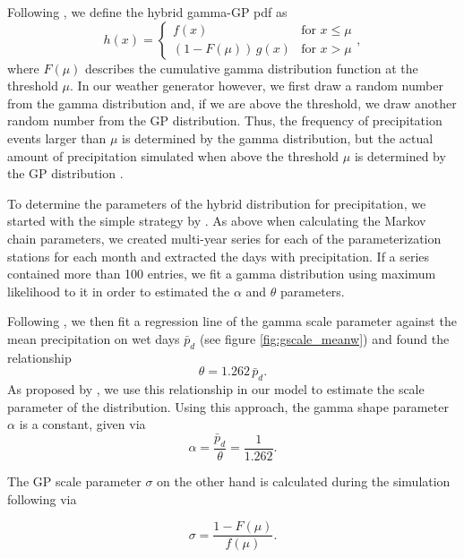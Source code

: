 \begin{refsection}
Following \cite{FurrerKatz2008}, we define the hybrid gamma-GP pdf as
\begin{equation}
h(x) = \begin{cases}
f(x) & \text{for } x \leq \mu \\
(1 - F(\mu))\,g(x) & \text{for }  x > \mu
\end{cases}, \label{eq:GammaGP}
\end{equation}
where $F(\mu)$ describes the cumulative gamma distribution function at the threshold $\mu$. In our weather generator however, we first draw a random number from the gamma distribution and, if we are above the threshold, we draw another random number from the GP distribution. Thus, the frequency of precipitation events larger than $\mu$ is determined by the gamma distribution, but the actual amount of precipitation simulated when above the threshold $\mu$ is determined by the GP distribution \citep{FurrerKatz2008}.

To determine the parameters of the hybrid distribution for precipitation, we started with the simple strategy by \cite{GengDevriesSupit1986}. As above when calculating the Markov chain parameters, we created multi-year series for each of the parameterization stations for each month and extracted the days with precipitation. If a series contained more than 100 entries, we fit a gamma distribution using maximum likelihood to it in order to estimated the $\alpha$ and $\theta$ parameters.

Following \cite{GengDevriesSupit1986}, we then fit a regression line of the gamma scale parameter against the mean precipitation on wet days $\bar{p}_d$ (see figure \ref{fig:gscale_meanw}) and found the relationship
\begin{equation}
\theta = 1.262\, \bar{p}_d. \label{eq:gamma_scale}
\end{equation}
As proposed by \cite{GengDevriesSupit1986}, we use this relationship in our model to estimate the scale parameter of the distribution. Using this approach, the gamma shape parameter $\alpha$ is a constant, given via
\begin{equation}
\alpha = \frac{\bar{p}_d}{\theta} = \frac{1}{1.262}. \label{eq:gamma_shape}
\end{equation}

The GP scale parameter $\sigma$ on the other hand is calculated during the simulation following \cite{NeykovNeytchevZucchini2014} via

\begin{equation}
\sigma = \frac{1 - F(\mu)}{f(\mu)}. \label{eq:gp_scale}
\end{equation}


\end{refsection}

